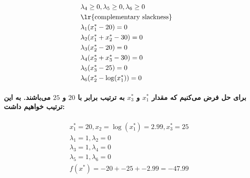 \documentclass[paper=a4, fontsize=11pt]{article}
\numberwithin{equation}{section} %
\numberwithin{figure}{section} %
\numberwithin{table}{section} %
\begin{document}
\begin{equation}
\begin{aligned}
		& \lambda_4 \ge 0,
		\lambda_5 \ge 0,
		\lambda_6 \ge 0 \\
		& \text{\lr{complementary slackness}} \\
		& \lambda_1(x^*_1 - 20) = 0\\
		& \lambda_2(x^*_1 + x^*_2 - 30) = 0 \\
		& \lambda_3(x^*_2 - 20) = 0 \\
		& \lambda_4(x^*_2 + x^*_3 - 30) = 0 \\
		& \lambda_5(x^*_3 - 25) = 0 \\
		& \lambda_6(x^*_2 - \log(x^*_1)) = 0 \\
	\end{aligned}					
\end{equation}

\paragraph{
	برای حل فرض می‌کنیم که مقدار $x^*_1$ و $x^*_3$ به ترتیب برابر با $20$ و $25$ می‌باشند. به این ترتیب خواهیم داشت:
}

\begin{equation}
	\begin{aligned}
		& x^*_1 = 20, x_2 = \log(x^*_1) = 2.99, x^*_3 = 25 \\
		& \lambda_1 = 1, \lambda_2 = 0 \\
		& \lambda_3 = 1, \lambda_4 = 0 \\
		& \lambda_5 = 1, \lambda_6 = 0 \\
		& f(x^*) = -20 + -25 + -2.99 = -47.99
	\end{aligned}					
\end{equation}
\end{document}

